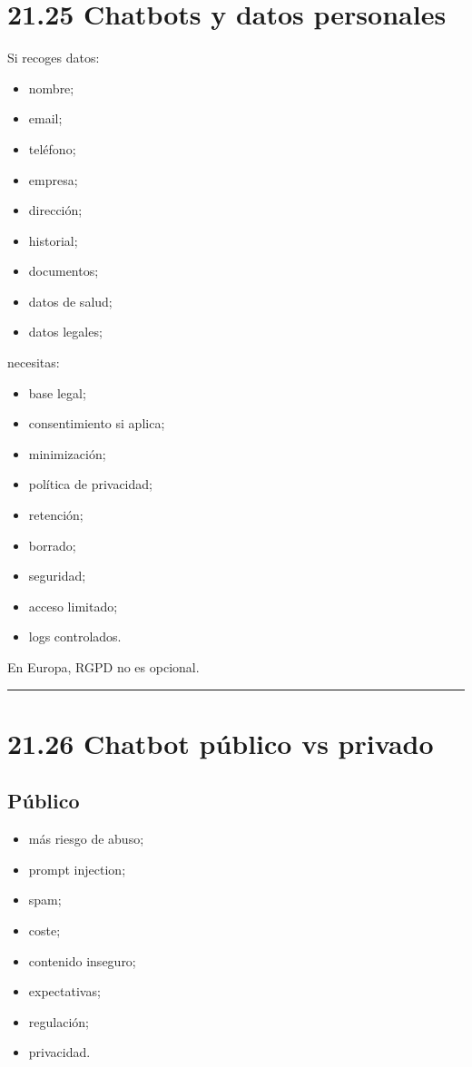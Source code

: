 \section{21.25 Chatbots y datos
personales}\label{chatbots-y-datos-personales}

Si recoges datos:

\begin{itemize}
\tightlist
\item
  nombre;
\item
  email;
\item
  teléfono;
\item
  empresa;
\item
  dirección;
\item
  historial;
\item
  documentos;
\item
  datos de salud;
\item
  datos legales;
\end{itemize}

necesitas:

\begin{itemize}
\tightlist
\item
  base legal;
\item
  consentimiento si aplica;
\item
  minimización;
\item
  política de privacidad;
\item
  retención;
\item
  borrado;
\item
  seguridad;
\item
  acceso limitado;
\item
  logs controlados.
\end{itemize}

En Europa, RGPD no es opcional.

\begin{center}\rule{0.5\linewidth}{0.5pt}\end{center}

\section{21.26 Chatbot público vs
privado}\label{chatbot-puxfablico-vs-privado}

\subsection{Público}\label{puxfablico}

\begin{itemize}
\tightlist
\item
  más riesgo de abuso;
\item
  prompt injection;
\item
  spam;
\item
  coste;
\item
  contenido inseguro;
\item
  expectativas;
\item
  regulación;
\item
  privacidad.
\end{itemize}

